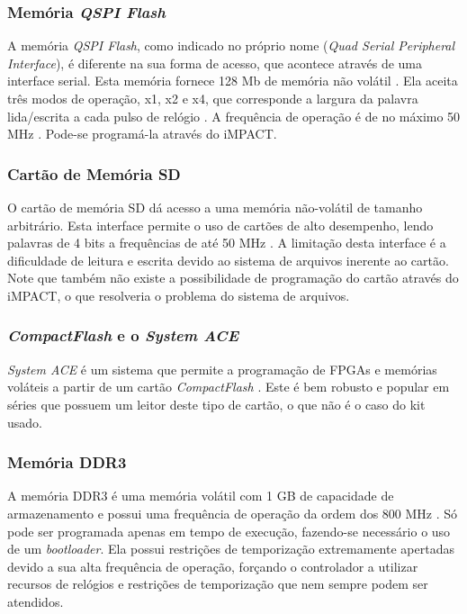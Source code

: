 \documentclass[11pt,a4paper,oneside]{book}
\begin{document}
\subsubsection{Memória \textit{QSPI Flash}}
A memória \textit{QSPI Flash}, como indicado no próprio nome (\textit{Quad Serial Peripheral Interface}), é diferente na sua forma de acesso, que acontece através de uma interface serial.
Esta memória fornece 128 Mb de memória não volátil \cite{ug810}.
Ela aceita três modos de operação, x1, x2 e x4, que corresponde a largura da palavra lida/escrita a cada pulso de relógio \cite{N25Q128}.
A frequência de operação é de no máximo 50 MHz \cite{xapp586}.
Pode-se programá-la através do iMPACT.

\subsubsection{Cartão de Memória SD}
O cartão de memória SD dá acesso a uma memória não-volátil de tamanho arbitrário.
Esta interface permite o uso de cartões de alto desempenho, lendo palavras de 4 bits a frequências de até 50 MHz \cite{ug810}.
A limitação desta interface é a dificuldade de leitura e escrita devido ao sistema de arquivos inerente ao cartão.
Note que também não existe a possibilidade de programação do cartão através do iMPACT, o que resolveria o problema do sistema de arquivos.

\subsubsection{\textit{CompactFlash} e o \textit{System ACE}}
\textit{System ACE} é um sistema que permite a programação de FPGAs e memórias voláteis a partir de um cartão \textit{CompactFlash} \cite{ds080, ds583}.
Este é bem robusto e popular em séries que possuem um leitor deste tipo de cartão, o que não é o caso do kit usado.

\subsubsection{Memória DDR3}
A memória DDR3 é uma memória volátil com 1 GB de capacidade de armazenamento e possui uma frequência de operação da ordem dos 800 MHz \cite{MT8JTF12864HZ}.
Só pode ser programada apenas em tempo de execução, fazendo-se necessário o uso de um \textit{bootloader}.
Ela possui restrições de temporização extremamente apertadas devido a sua alta frequência de operação, forçando o controlador a utilizar recursos de relógios e restrições de temporização que nem sempre podem ser atendidos.
\end{document}
